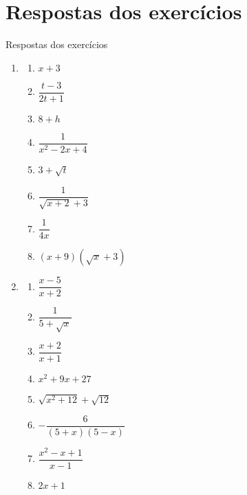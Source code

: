 \documentclass[14pt, aspectratio=169]{beamer}
\newcommand{\parenthesis}[1]{\left( #1 \right)}
\begin{document}
\section{Respostas dos exercícios}

\begin{frame}[allowframebreaks]{Respostas dos exercícios}

\begin{enumerate}
    \item 

    \begin{multicols}{2}
        \begin{enumerate}[a]
            \item $x + 3$
            \item $\dfrac{t - 3}{2t + 1}$
            \item $8 + h$
            \item $\dfrac{1}{x^2 - 2x + 4}$
            \item $3 +  \sqrt{t}$
            \item $\dfrac{1}{\sqrt{x+2} + 3}$
            \item $\dfrac{1}{4x}$
            \item $\parenthesis{x+9}\parenthesis{\sqrt{x}+3}$
            \end{enumerate}
    \end{multicols}
    

    \item 

    \begin{multicols}{2}
        \begin{enumerate}[a]
            \item $\dfrac{x-5}{x+2}$
            \item $\dfrac{1}{5 + \sqrt{x}}$
            \item $\dfrac{x+2}{x+1}$
            \item $x^2 + 9x + 27$
            \item $\sqrt{x^2 + 12} + \sqrt{12}$
            \item $-\dfrac{6}{\parenthesis{5+x}\parenthesis{5-x}}$
            \item $\dfrac{x^2-x+1}{x-1}$
            \item $2x+1$
            \end{enumerate}
    \end{multicols}
\end{enumerate}
    
\end{frame}
\end{document}
